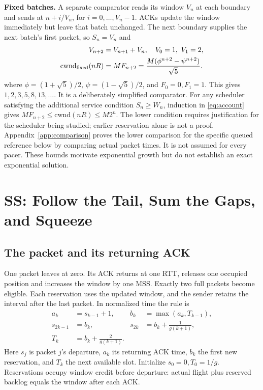 \documentclass[sigconf,nonacm]{acmart}
\newcommand{\cwnd}{\mathrm{cwnd}}
\begin{document}
\textbf{Fixed batches.} A separate comparator reads its window $V_n$ at each boundary and sends at $n+i/V_n$, for $i=0,\ldots,V_n-1$. ACKs update the window immediately but leave that batch unchanged. The next boundary supplies the next batch's first packet, so $S_n=V_n$ and
\begin{equation}
\begin{aligned}
 V_{n+2}&=V_{n+1}+V_n,\quad V_0=1,\ V_1=2,\\
 \cwnd_{\rm fixed}(nR)&=M F_{n+2}
 =\frac{M(\phi^{n+2}-\psi^{n+2})}{\sqrt5}.
\end{aligned}\label{eq:fib}
\end{equation}
where $\phi=(1+\sqrt5)/2$, $\psi=(1-\sqrt5)/2$, and $F_0=0,F_1=1$. This gives $1,2,3,5,8,13,\ldots$. It is a deliberately simplified comparator. For any scheduler satisfying the additional service condition $S_n\ge W_n$, induction in \eqref{eq:account} gives $MF_{n+2}\le\cwnd(nR)\le M2^n$. The lower condition requires justification for the scheduler being studied; earlier reservation alone is not a proof. Appendix~\ref{app:comparison} proves the lower comparison for the specific queued reference below by comparing actual packet times. It is not assumed for every pacer. These bounds motivate exponential growth but do not establish an exact exponential solution.

\section{SS: Follow the Tail, Sum the Gaps, and Squeeze}
\subsection{The packet and its returning ACK}
One packet leaves at zero. Its ACK returns at one RTT, releases one occupied
position and increases the window by one MSS. Exactly two full packets
become eligible. Each reservation uses the updated window, and the sender
retains the interval after the last packet. In normalized time the rule is
\begin{equation}\begin{aligned}
 a_k&=s_{k-1}+1,& b_k&=\max(a_k,T_{k-1}),\\
 s_{2k-1}&=b_k,&s_{2k}&=b_k+\frac1{g(k+1)},\\
 T_k&=b_k+\frac2{g(k+1)}.
\end{aligned}\label{eq:queued}\end{equation}
Here $s_j$ is packet $j$'s departure, $a_k$ its returning ACK time, $b_k$
the first new reservation, and $T_k$ the next available slot. Initialize
$s_0=0,T_0=1/g$. Reservations occupy window credit before departure:
actual flight plus reserved backlog equals the window after each ACK.
\end{document}

